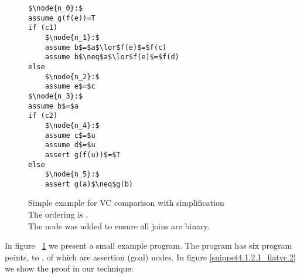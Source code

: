 \begin{figure}
\begin{lstlisting}
$\node{n_0}:$
assume g(f(e))=T
if (c1)
	$\node{n_1}:$	
	assume b$=$a$\lor$f(e)$=$f(c)
	assume b$\neq$a$\lor$f(e)$=$f(d)
else	
	$\node{n_2}:$
	assume e$=$c
$\node{n_3}:$
assume b$=$a
if (c2)
	$\node{n_4}:$
	assume c$=$u
	assume d$=$u
	assert g(f(u))$=$T
else	
	$\node{n_5}:$
	assert g(a)$\neq$g(b)
\end{lstlisting}
\caption{Simple example for VC comparison with simplification\\
The ordering is .\\
The node  was added to ensure all joins are binary.
}
\label{snippet4.1.2.1}
\end{figure}



In figure ~\ref{snippet4.1.2.1} we present a small example program. 
The program has six program points,  to , of which  are assertion (goal) nodes.
In figure \ref{snippet4.1.2.1_flatvc.2} we show the proof in our technique:

